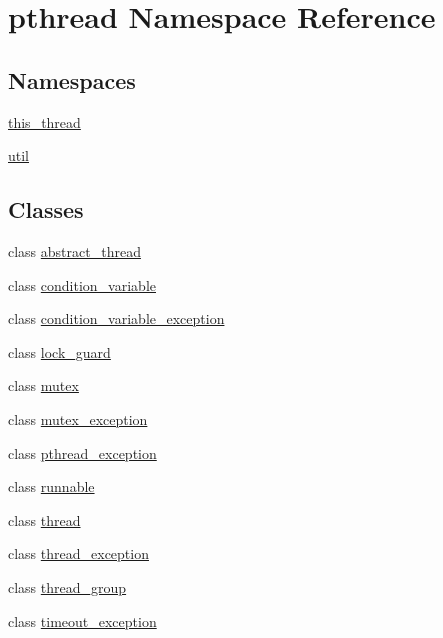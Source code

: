 \hypertarget{namespacepthread}{}\section{pthread Namespace Reference}
\label{namespacepthread}
\subsection*{Namespaces}
\begin{DoxyCompactItemize}
\item 
 \hyperlink{namespacepthread_1_1this__thread}{this\+\_\+thread}
\item 
 \hyperlink{namespacepthread_1_1util}{util}
\end{DoxyCompactItemize}
\subsection*{Classes}
\begin{DoxyCompactItemize}
\item 
class \hyperlink{classpthread_1_1abstract__thread}{abstract\+\_\+thread}
\item 
class \hyperlink{classpthread_1_1condition__variable}{condition\+\_\+variable}
\item 
class \hyperlink{classpthread_1_1condition__variable__exception}{condition\+\_\+variable\+\_\+exception}
\item 
class \hyperlink{classpthread_1_1lock__guard}{lock\+\_\+guard}
\item 
class \hyperlink{classpthread_1_1mutex}{mutex}
\item 
class \hyperlink{classpthread_1_1mutex__exception}{mutex\+\_\+exception}
\item 
class \hyperlink{classpthread_1_1pthread__exception}{pthread\+\_\+exception}
\item 
class \hyperlink{classpthread_1_1runnable}{runnable}
\item 
class \hyperlink{classpthread_1_1thread}{thread}
\item 
class \hyperlink{classpthread_1_1thread__exception}{thread\+\_\+exception}
\item 
class \hyperlink{classpthread_1_1thread__group}{thread\+\_\+group}
\item 
class \hyperlink{classpthread_1_1timeout__exception}{timeout\+\_\+exception}
\end{DoxyCompactItemize}
